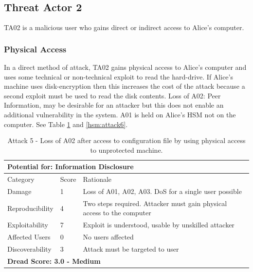 \documentclass [11pt, proquest] {uwthesis}[2020/02/24]
\begin{document}
\subsection{Threat Actor 2}
TA02 is a malicious user who gains direct or indirect access to Alice's computer. 

\subsubsection{Physical Access}
In a direct method of attack, TA02 gains physical access to Alice's computer and uses some technical or non-technical exploit to read the hard-drive. If Alice's machine uses disk-encryption then this increases the cost of the attack because a second exploit must be used to read the disk contents.
Loss of A02: Peer Information, may be desirable for an attacker but this does not enable an additional vulnerability in the system.
A01 is held on Alice's HSM not on the computer.
See Table \ref{hsm:attack5} and \ref{hsm:attack6}.

\begin{table}[H]
\begin{tabular}{|m{3cm}|m{1cm}|p{27em} |}
\multicolumn{3}{l}{Potential for: Information Disclosure}   \\
\hline
Category & Score & Rationale \\
\hline
Damage          & 1     & Loss of A01, A02, A03. DoS for a single user possible   \\
\hline
Reproducibility & 4     & Two steps required. Attacker must gain physical access to the computer \\
\hline
Exploitability & 7      & Exploit is understood, usable by unskilled attacker \\
\hline
Affected Users  & 0     &  No users affected   \\
\hline
Discoverability & 3     & Attack must be targeted to user \\
\hline
\multicolumn{3}{l}{\textbf{Dread Score: 3.0 - Medium}} 
\end{tabular}
\caption{Attack 5 - Loss of A02 after access to configuration file by using physical access to unprotected machine.}
\label{hsm:attack5}
\end{table}
\end{document}
